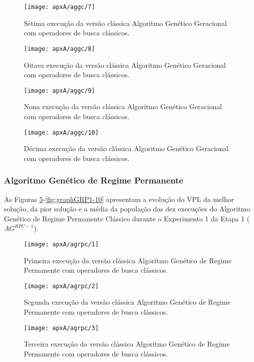 \begin{figure}[H]
\centering
\texttt{[image: apxA/aggc/7]}
\caption{Sétima execução da versão clássica Algoritmo Genético Geracional com operadores de busca clássicos.}
\label{fig:graphGC1-07}
\end{figure}

\begin{figure}[H]
\centering
\texttt{[image: apxA/aggc/8]}
\caption{Oitava execução da versão clássica Algoritmo Genético Geracional com operadores de busca clássicos.}
\label{fig:graphGC1-08}
\end{figure}

\begin{figure}[H]
\centering
\texttt{[image: apxA/aggc/9]}
\caption{Nona execução da versão clássica Algoritmo Genético Geracional com operadores de busca clássicos.}
\label{fig:graphGC1-09}
\end{figure}

\begin{figure}[H]
\centering
\texttt{[image: apxA/aggc/10]}
\caption{Décima execução da versão clássica Algoritmo Genético Geracional com operadores de busca clássicos.}
\label{fig:graphGC1-10}
\end{figure}

\subsubsection{Algoritmo Genético de Regime Permanente}
As Figuras \ref{fig:graphGRP1-01}-\ref{fig:graphGRP1-10} apresentam a evolução do VPL da melhor solução, da pior solução e a média da população das dez execuções do Algoritmo Genético de Regime Permanente Clássico durante o Experimento 1 da Etapa 1 ($AG^{RPC-1}$).

\begin{figure}[H]
\centering
\texttt{[image: apxA/agrpc/1]}
\caption{Primeira execução da versão clássica Algoritmo Genético de Regime Permanente com operadores de busca clássicos.}
\label{fig:graphGRP1-01}
\end{figure}

\begin{figure}[H]
\centering
\texttt{[image: apxA/agrpc/2]}
\caption{Segunda execução da versão clássica Algoritmo Genético de Regime Permanente com operadores de busca clássicos.}
\label{fig:graphGRP1-02}
\end{figure}

\begin{figure}[H]
\centering
\texttt{[image: apxA/agrpc/3]}
\caption{Terceira execução da versão clássica Algoritmo Genético de Regime Permanente com operadores de busca clássicos.}
\label{fig:graphGRP1-03}
\end{figure}

